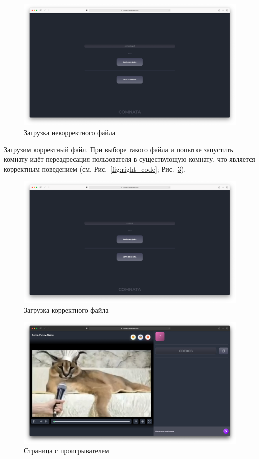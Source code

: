 \documentclass{../../includes/TechDocMultiAuthors}
\begin{document}
    \begin{figure}[H]
        \centering
        \includegraphics[width=0.9\linewidth]{../images/wrong_file.png}
        \caption{Загрузка некорректного файла}
        \label{fig:wrong_file}
    \end{figure}

    Загрузим корректный файл.
    При выборе такого файла и попытке запустить комнату идёт переадресация пользователя в существующую комнату, что является корректным поведением (см. Рис.~\ref{fig:right_code}; Рис.~\ref{fig:player2}).

    \begin{figure}[H]
        \centering
        \includegraphics[width=0.9\linewidth]{../images/right_code.png}
        \caption{Загрузка корректного файла}
        \label{fig:right_file}
    \end{figure}

    \begin{figure}[H]
        \centering
        \includegraphics[width=0.9\linewidth]{../images/player.png}
        \caption{Страница с проигрывателем}
        \label{fig:player2}
    \end{figure}
\end{document}

